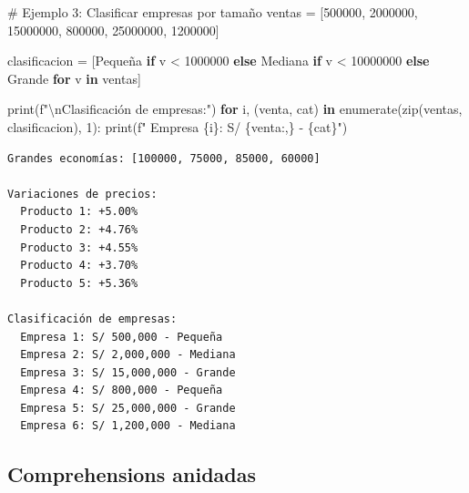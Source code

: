\documentclass[
  doc,
  floatsintext,
  longtable,
  a4paper,
  nolmodern,
  notxfonts,
  notimes,
  12pt,
  colorlinks=true,linkcolor=blue,citecolor=blue,urlcolor=blue]{apa7}
\newenvironment{Shaded}{\begin{snugshade}}{\end{snugshade}}
\newcommand{\BuiltInTok}[1]{\textcolor[rgb]{0.00,0.23,0.31}{#1}}
\newcommand{\CharTok}[1]{\textcolor[rgb]{0.13,0.47,0.30}{#1}}
\newcommand{\CommentTok}[1]{\textcolor[rgb]{0.37,0.37,0.37}{#1}}
\newcommand{\ControlFlowTok}[1]{\textcolor[rgb]{0.00,0.23,0.31}{\textbf{#1}}}
\newcommand{\DecValTok}[1]{\textcolor[rgb]{0.68,0.00,0.00}{#1}}
\newcommand{\KeywordTok}[1]{\textcolor[rgb]{0.00,0.23,0.31}{\textbf{#1}}}
\newcommand{\NormalTok}[1]{\textcolor[rgb]{0.00,0.23,0.31}{#1}}
\newcommand{\OperatorTok}[1]{\textcolor[rgb]{0.37,0.37,0.37}{#1}}
\newcommand{\SpecialCharTok}[1]{\textcolor[rgb]{0.37,0.37,0.37}{#1}}
\newcommand{\SpecialStringTok}[1]{\textcolor[rgb]{0.13,0.47,0.30}{#1}}
\newcommand{\StringTok}[1]{\textcolor[rgb]{0.13,0.47,0.30}{#1}}
\begin{document}
\begin{Shaded}
\begin{Highlighting}[]
\CommentTok{\# Ejemplo 3: Clasificar empresas por tamaño}
\NormalTok{ventas }\OperatorTok{=}\NormalTok{ [}\DecValTok{500000}\NormalTok{, }\DecValTok{2000000}\NormalTok{, }\DecValTok{15000000}\NormalTok{, }\DecValTok{800000}\NormalTok{, }\DecValTok{25000000}\NormalTok{, }\DecValTok{1200000}\NormalTok{]}

\NormalTok{clasificacion }\OperatorTok{=}\NormalTok{ [}\StringTok{\textquotesingle{}Pequeña\textquotesingle{}} \ControlFlowTok{if}\NormalTok{ v }\OperatorTok{\textless{}} \DecValTok{1000000} 
                 \ControlFlowTok{else} \StringTok{\textquotesingle{}Mediana\textquotesingle{}} \ControlFlowTok{if}\NormalTok{ v }\OperatorTok{\textless{}} \DecValTok{10000000} 
                 \ControlFlowTok{else} \StringTok{\textquotesingle{}Grande\textquotesingle{}} 
                 \ControlFlowTok{for}\NormalTok{ v }\KeywordTok{in}\NormalTok{ ventas]}

\BuiltInTok{print}\NormalTok{(}\SpecialStringTok{f"}\CharTok{\textbackslash{}n}\SpecialStringTok{Clasificación de empresas:"}\NormalTok{)}
\ControlFlowTok{for}\NormalTok{ i, (venta, cat) }\KeywordTok{in} \BuiltInTok{enumerate}\NormalTok{(}\BuiltInTok{zip}\NormalTok{(ventas, clasificacion), }\DecValTok{1}\NormalTok{):}
    \BuiltInTok{print}\NormalTok{(}\SpecialStringTok{f"  Empresa }\SpecialCharTok{\{}\NormalTok{i}\SpecialCharTok{\}}\SpecialStringTok{: S/ }\SpecialCharTok{\{}\NormalTok{venta}\SpecialCharTok{:,\}}\SpecialStringTok{ {-} }\SpecialCharTok{\{}\NormalTok{cat}\SpecialCharTok{\}}\SpecialStringTok{"}\NormalTok{)}
\end{Highlighting}
\end{Shaded}

\begin{verbatim}
Grandes economías: [100000, 75000, 85000, 60000]

Variaciones de precios:
  Producto 1: +5.00%
  Producto 2: +4.76%
  Producto 3: +4.55%
  Producto 4: +3.70%
  Producto 5: +5.36%

Clasificación de empresas:
  Empresa 1: S/ 500,000 - Pequeña
  Empresa 2: S/ 2,000,000 - Mediana
  Empresa 3: S/ 15,000,000 - Grande
  Empresa 4: S/ 800,000 - Pequeña
  Empresa 5: S/ 25,000,000 - Grande
  Empresa 6: S/ 1,200,000 - Mediana
\end{verbatim}

\subsection{Comprehensions anidadas}\label{comprehensions-anidadas}
\end{document}
